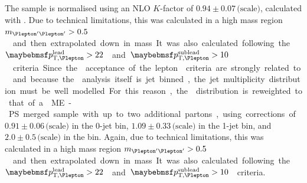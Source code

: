 The \sherpa sample is normalised using an NLO $K$-factor of $0.94\pm0.07\,\text{(scale)}$, 
calculated with \mcfm. Due to technical limitations, this was calculated in a high mass 
region \unit{$m_{\HepProcess{\Plepton'\Plepton'}} > 0.5$}{\GeV} and then extrapolated down in 
mass. It was also calculated following the \unit{$\ptleadlep > 22$}{\GeV} and 
\unit{$\ptsubleadlep > 10$}{\GeV} criteria.

Since the \Wgstar acceptance of the lepton \pt criteria are strongly related to \njets and 
because the \HWW analysis itself is jet binned, the jet multiplicity distribution must be 
well modelled. For this reason, the \njets distribution is reweighted to that of a \sherpa 
ME-PS merged sample with up to two additional partons, using corrections of 
$0.91\pm0.06\,\text{(scale)}$ in the 0-jet bin, $1.09\pm0.33\,\text{(scale)}$ in the 1-jet 
bin, and $2.0\pm0.5\,\text{(scale)}$ in the \twojet bin. Again, due to technical limitations, 
this was calculated in a high mass region \unit{$m_{\HepProcess{\Plepton'\Plepton'}} > 
0.5$}{\GeV} and then extrapolated down in mass. It was also calculated following the 
\unit{$\ptleadlep > 22$}{\GeV} and \unit{$\ptsubleadlep > 10$}{\GeV} criteria.

